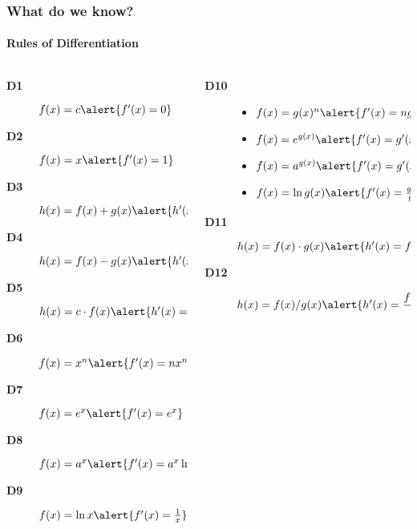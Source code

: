 \documentclass[9pt,xcolor=x11names,compress]{beamer}
\begin{document}
\begin{frame}\frametitle{What do we know?}
\framesubtitle{Rules of Differentiation}
\fontsize{7}{8.2}\selectfont
\begin{columns}[T]
\begin{column}{0.45\linewidth}
\begin{description}
	\item[\textbf{D1}] $f(x)=c\newline \alert{f'(x)=0}$
	\item[\textbf{D2}] $f(x)=x\newline \alert{f'(x)=1}$
	\item[\textbf{D3}] $h(x)=f(x)+g(x)\newline \alert{h'(x)=f'(x)+g'(x)}$
	\item[\textbf{D4}] $h(x)=f(x)-g(x)\newline \alert{h'(x)=f'(x)-g'(x)}$
	\item[\textbf{D5}] $h(x)=c\cdot f(x)\newline \alert{h'(x)=c\cdot f'(x)}$
	\item[\textbf{\alert{D6}}] $f(x)=x^n\newline \alert{f'(x)=nx^{n-1}}$
	\item[\textbf{\alert{D7}}] $f(x)=e^x\newline \alert{f'(x)=e^x}$
	\item[\textbf{\alert{D8}}] $f(x)=a^x\newline \alert{f'(x)=a^x \ln a}$
	\item[\textbf{\alert{D9}}] $f(x)=\ln x\newline \alert{f'(x)=\frac{1}{x}}$
\end{description}
\end{column}
\begin{column}{0.55\linewidth}
	\begin{description}
	\item[\textbf{D10}] 
	\begin{itemize}
	\item $f(x)=g(x)^n\newline \alert{f'(x)=ng(x)^{n-1}g'(x)}$
	\item $f(x)=e^{g(x)}\newline \alert{f'(x)=g'(x)e^{g(x)}}$
	\item $f(x)=a^{g(x)}\newline \alert{f'(x)=g'(x)\ln a\,a^{g(x)}}$
	\item $f(x)=\ln g(x)\newline \alert{f'(x)=\frac{g'(x)}{g(x)}}$
	\end{itemize}
	\item[\textbf{D11}] $h(x)=f(x)\cdot g(x)\newline \alert{h'(x)=f'(x)g(x)+f(x)g'(x)}$
	\item[\textbf{D12}] $h(x)=f(x)/g(x)\newline \alert{h'(x)=\dfrac{f'(x)g(x)-f(x)g'(x)}{g(x)^2}}$
\end{description}
\end{column}
\end{columns}
\end{frame}
\end{document}
